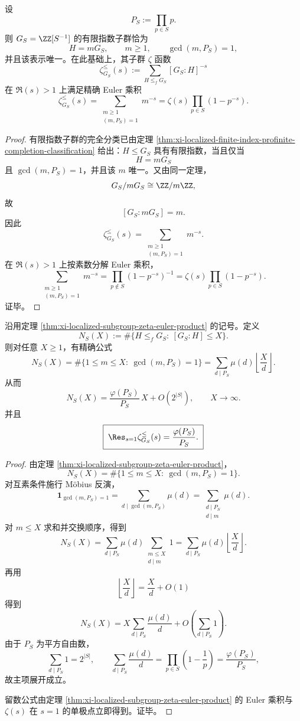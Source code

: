 \begin{theorem}\label{thm:xi-localized-subgroup-zeta-euler-product}
设
\[
P_S:=\prod_{p\in S}p.
\]
则 \(G_S=\ZZ[S^{-1}]\) 的有限指数子群恰为
\[
H=mG_S,
\qquad
m\ge 1,
\qquad
\gcd(m,P_S)=1,
\]
并且该表示唯一。在此基础上，其子群 \(\zeta\) 函数
\[
\zeta_{G_S}^{\le}(s)
:=
\sum_{H\le_f G_S}[G_S:H]^{-s}
\]
在 \(\Re(s)>1\) 上满足精确 Euler 乘积
\[
\boxed{\;
\zeta_{G_S}^{\le}(s)
=
\sum_{\substack{m\ge 1\\ (m,P_S)=1}}m^{-s}
=
\zeta(s)\prod_{p\in S}(1-p^{-s}).\;}
\]
\end{theorem}
\begin{proof}
有限指数子群的完全分类已由定理 \ref{thm:xi-localized-finite-index-profinite-completion-classification} 给出：\(H\le G_S\) 具有有限指数，当且仅当
\[
H=mG_S
\]
且 \(\gcd(m,P_S)=1\)，并且该 \(m\) 唯一。又由同一定理，
\[
G_S/mG_S\cong \ZZ/m\ZZ,
\]
故
\[
[G_S:mG_S]=m.
\]
因此
\[
\zeta_{G_S}^{\le}(s)
=
\sum_{\substack{m\ge 1\\ (m,P_S)=1}}m^{-s}.
\]
在 \(\Re(s)>1\) 上按素数分解 Euler 乘积，
\[
\sum_{\substack{m\ge 1\\ (m,P_S)=1}}m^{-s}
=
\prod_{p\notin S}(1-p^{-s})^{-1}
=
\zeta(s)\prod_{p\in S}(1-p^{-s}).
\]
证毕。
\end{proof}

\begin{corollary}\label{cor:xi-localized-subgroup-counting-main-term}
沿用定理 \ref{thm:xi-localized-subgroup-zeta-euler-product} 的记号。定义
\[
N_S(X)
:=
\#\{H\le_f G_S:\ [G_S:H]\le X\}.
\]
则对任意 \(X\ge 1\)，有精确公式
\[
N_S(X)
=
\#\{1\le m\le X:\ \gcd(m,P_S)=1\}
=
\sum_{d\mid P_S}\mu(d)\left\lfloor\frac{X}{d}\right\rfloor.
\]
从而
\[
\boxed{\;
N_S(X)
=
\frac{\varphi(P_S)}{P_S}\,X+O(2^{|S|}),
\qquad
X\to\infty.\;}
\]
并且
\[
\boxed{\;
\Res_{s=1}\zeta_{G_S}^{\le}(s)
=
\frac{\varphi(P_S)}{P_S}.\;}
\]
\end{corollary}
\begin{proof}
由定理 \ref{thm:xi-localized-subgroup-zeta-euler-product}，
\[
N_S(X)=\#\{1\le m\le X:\ \gcd(m,P_S)=1\}.
\]
对互素条件施行 Möbius 反演，
\[
\mathbf 1_{\gcd(m,P_S)=1}
=
\sum_{d\mid \gcd(m,P_S)}\mu(d)
=
\sum_{\substack{d\mid P_S\\ d\mid m}}\mu(d).
\]
对 \(m\le X\) 求和并交换顺序，得到
\[
N_S(X)
=
\sum_{d\mid P_S}\mu(d)\sum_{\substack{m\le X\\ d\mid m}}1
=
\sum_{d\mid P_S}\mu(d)\left\lfloor\frac{X}{d}\right\rfloor.
\]
再用
\[
\left\lfloor\frac{X}{d}\right\rfloor=\frac{X}{d}+O(1)
\]
得到
\[
N_S(X)
=
X\sum_{d\mid P_S}\frac{\mu(d)}{d}
+O\!\left(\sum_{d\mid P_S}1\right).
\]
由于 \(P_S\) 为平方自由数，
\[
\sum_{d\mid P_S}1=2^{|S|},
\qquad
\sum_{d\mid P_S}\frac{\mu(d)}{d}
=
\prod_{p\in S}\left(1-\frac1p\right)
=
\frac{\varphi(P_S)}{P_S},
\]
故主项展开成立。

留数公式由定理 \ref{thm:xi-localized-subgroup-zeta-euler-product} 的 Euler 乘积与 \(\zeta(s)\) 在 \(s=1\) 的单极点立即得到。证毕。
\end{proof}


